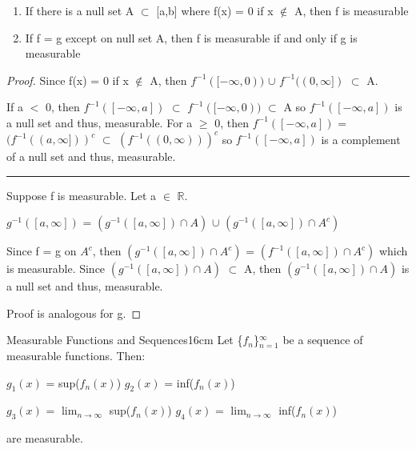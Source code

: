     \begin{enumerate}[label=(\alph*), leftmargin=2cm, itemsep=0.1cm]
        \item  If there is a null set A $\subset$ [a,b] where f(x) = 0 if
            x $\not \in$ A, then f is measurable

        \item If f = g except on null set A, then f is measurable if and only if
            g is measurable
    \end{enumerate}

    \begin{proof}
        Since f(x) = 0 if x $\not \in$ A, then
        $f^{-1}([-\infty,0))$ $\cup$ $f^{-1}((0,\infty])$ $\subset$ A.

        If a $<$ 0, then $f^{-1}([-\infty,a])$ $\subset$ $f^{-1}([-\infty,0))$
        $\subset$ A so $f^{-1}([-\infty,a])$ is a null set and thus,
        measurable.
        For a $\geq$ 0, then $f^{-1}([-\infty,a])$
        = $(f^{-1}((a,\infty]))^c$ $\subset$ $(f^{-1}((0,\infty)))^c$
        so $f^{-1}([-\infty,a])$ is a complement of a null set and thus,
        measurable.

        \rule[0.1cm]{15.2cm}{0.01cm}

        Suppose f is measurable. Let a $\in$ $\mathbb{R}$.

        \hspace{0.5cm}
        $g^{-1}([a,\infty])$
        = $(g^{-1}([a,\infty]) \cap A)$ $\cup$ $(g^{-1}([a,\infty]) \cap A^c)$

        Since f = g on $A^c$, then
        $(g^{-1}([a,\infty]) \cap A^c)$
        = $(f^{-1}([a,\infty]) \cap A^c)$ which is measurable.
        Since $(g^{-1}([a,\infty]) \cap A)$ $\subset$ A, then
        $(g^{-1}([a,\infty]) \cap A)$ is a null set and thus, measurable.

        Proof is analogous for g.
    \end{proof}

    \vspace{0.5cm}



    \begin{wtheorem}{Measurable Functions and Sequences}{16cm}
        Let \{$f_n$\}$_{n=1}^{\infty}$ be a sequence of measurable functions.
        Then:

        \hspace{0.5cm}
        $g_1(x)$ = sup($f_n(x)$)
        \hspace{2.5cm}
        $g_2(x)$ = inf($f_n(x)$)

        \hspace{0.5cm}
        $g_3(x)$ = $\lim_{n \rightarrow \infty}$ sup($f_n(x)$)
        \hspace{1cm}
        $g_4(x)$ = $\lim_{n \rightarrow \infty}$ inf($f_n(x)$)

        are measurable.
    \end{wtheorem}

